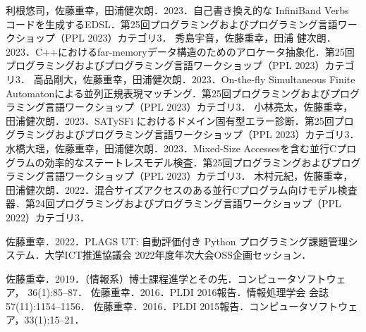 \documentclass[dvipdfmx]{jsarticle}
\begin{document}
\begin{thebibliography}{100}
  利根悠司，佐藤重幸，田浦健次朗．2023．自己書き換え的な InfiniBand Verbs コードを生成するEDSL．第25回プログラミングおよびプログラミング言語ワークショップ（PPL 2023）カテゴリ3．
  秀島宇音，佐藤重幸，田浦 健次朗．2023．C++におけるfar-memoryデータ構造のためのアロケータ抽象化．第25回プログラミングおよびプログラミング言語ワークショップ（PPL 2023）カテゴリ3．
  高品剛大，佐藤重幸，田浦健次朗．2023．On-the-fly Simultaneous Finite Automatonによる並列正規表現マッチング．第25回プログラミングおよびプログラミング言語ワークショップ（PPL 2023）カテゴリ3．
  小林亮太，佐藤重幸，田浦健次朗．2023．SATySFi におけるドメイン固有型エラー診断．第25回プログラミングおよびプログラミング言語ワークショップ（PPL 2023）カテゴリ3．
  水橋大瑶，佐藤重幸，田浦健次朗．2023．Mixed-Size Accessesを含む並行Cプログラムの効率的なステートレスモデル検査．第25回プログラミングおよびプログラミング言語ワークショップ（PPL 2023）カテゴリ3．
  木村元紀，佐藤重幸，田浦健次朗．2022．混合サイズアクセスのある並行Cプログラム向けモデル検査器．第24回プログラミングおよびプログラミング言語ワークショップ（PPL 2022）カテゴリ3．

  佐藤重幸．2022．PLAGS UT: 自動評価付き Python プログラミング課題管理システム．大学ICT推進協議会 2022年度年次大会OSS企画セッション．

  佐藤重幸．2019．（情報系）博士課程進学とその先．コンピュータソフトウェア， 36(1):85–87．
  佐藤重幸．2016．PLDI 2016報告．情報処理学会 会誌 57(11):1154–1156．
  佐藤重幸．2016．PLDI 2015報告．コンピュータソフトウェア，33(1):15–21．
\end{thebibliography}
\end{document}

